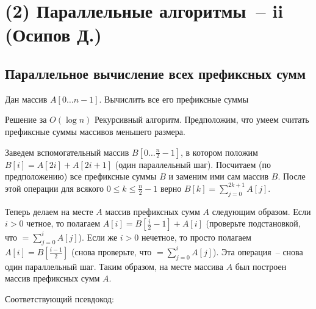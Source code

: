 \section{(2) Параллельные алгоритмы~-- ii (Осипов Д.)}
\subsection{Параллельное вычисление всех префиксных сумм}\label{parallel_sums}
\begin{problem*}
	Дан массив $A[0\ldots n-1]$. Вычислить все его префиксные суммы
\end{problem*}

\begin{algodescription}{Решение за $O(\log n)$} Рекурсивный алгоритм. Предположим, что умеем считать префиксные суммы массивов меньшего размера.

Заведем вспомогательный массив $B[0\ldots \frac{n}{2}-1]$, в котором положим $B[i]=A[2i]+A[2i+1]$ (один параллельный шаг). Посчитаем (по предположению) все префиксные суммы $B$ и заменим ими сам массив $B$. После этой операции для всякого $0 \leq k \leq \frac{n}{2}-1$ верно $B[k] = \sum_{j=0}^{2k+1} A[j]$.

Теперь делаем на месте $A$ массив префиксных сумм $A$ следующим образом. Если $i > 0$ четное, то полагаем $A[i] = B[\frac{i}{2}-1] + A[i]$ (проверьте подстановкой, что $=\sum_{j=0}^{i}A[j]$). Если же $i > 0$ нечетное, то просто полагаем $A[i] = B[\frac{i-1}{2}]$ (снова проверьте, что $=\sum_{j=0}^{i}A[j]$). Эта операция~-- снова один параллельный шаг. Таким образом, на месте массива $A$ был построен массив префиксных сумм $A$.
\end{algodescription}

Соответствующий псевдокод:

\begin{algorithm}[H]
	\DontPrintSemicolon
\end{algorithm}

